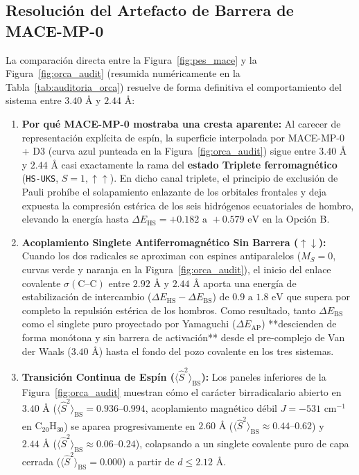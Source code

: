 \documentclass[10pt,twocolumn,a4paper]{article}
\begin{document}
\subsection{Resolución del Artefacto de Barrera de MACE-MP-0}
La comparación directa entre la Figura~\ref{fig:pes_mace} y la Figura~\ref{fig:orca_audit} (resumida numéricamente en la Tabla~\ref{tab:auditoria_orca}) resuelve de forma definitiva el comportamiento del sistema entre $3.40\text{ \AA}$ y $2.44\text{ \AA}$:
\begin{enumerate}
    \item \textbf{Por qué MACE-MP-0 mostraba una cresta aparente:} Al carecer de representación explícita de espín, la superficie interpolada por MACE-MP-0 + D3 (curva azul punteada en la Figura~\ref{fig:orca_audit}) sigue entre $3.40\text{ \AA}$ y $2.44\text{ \AA}$ casi exactamente la rama del \textbf{estado Triplete ferromagnético} (\texttt{HS-UKS}, $S=1, \uparrow\uparrow$). En dicho canal triplete, el principio de exclusión de Pauli prohíbe el solapamiento enlazante de los orbitales frontales y deja expuesta la compresión estérica de los seis hidrógenos ecuatoriales de hombro, elevando la energía hasta $\Delta E_{\text{HS}} = +0.182\text{ a }+0.579\text{ eV}$ en la Opción B.
    \item \textbf{Acoplamiento Singlete Antiferromagnético Sin Barrera ($\uparrow\downarrow$):} Cuando los dos radicales se aproximan con espines antiparalelos ($M_S=0$, curvas verde y naranja en la Figura~\ref{fig:orca_audit}), el inicio del enlace covalente $\sigma(\text{C--C})$ entre $2.92\text{ \AA}$ y $2.44\text{ \AA}$ aporta una energía de estabilización de intercambio ($\Delta E_{\text{HS}} - \Delta E_{\text{BS}}$) de $0.9\text{ a }1.8\text{ eV}$ que supera por completo la repulsión estérica de los hombros. Como resultado, tanto $\Delta E_{\text{BS}}$ como el singlete puro proyectado por Yamaguchi ($\Delta E_{\text{AP}}$) **descienden de forma monótona y sin barrera de activación** desde el pre-complejo de Van der Waals ($3.40\text{ \AA}$) hasta el fondo del pozo covalente en los tres sistemas.
    \item \textbf{Transición Continua de Espín ($\langle \hat{S}^2 \rangle_{\text{BS}}$):} Los paneles inferiores de la Figura~\ref{fig:orca_audit} muestran cómo el carácter birradicalario abierto en $3.40\text{ \AA}$ ($\langle \hat{S}^2 \rangle_{\text{BS}} = 0.936\text{--}0.994$, acoplamiento magnético débil $J = -531\text{ cm}^{-1}$ en $\text{C}_{20}\text{H}_{30}$) se aparea progresivamente en $2.60\text{ \AA}$ ($\langle \hat{S}^2 \rangle_{\text{BS}} \approx 0.44\text{--}0.62$) y $2.44\text{ \AA}$ ($\langle \hat{S}^2 \rangle_{\text{BS}} \approx 0.06\text{--}0.24$), colapsando a un singlete covalente puro de capa cerrada ($\langle \hat{S}^2 \rangle_{\text{BS}} = 0.000$) a partir de $d \le 2.12\text{ \AA}$.
\end{enumerate}
\end{document}
